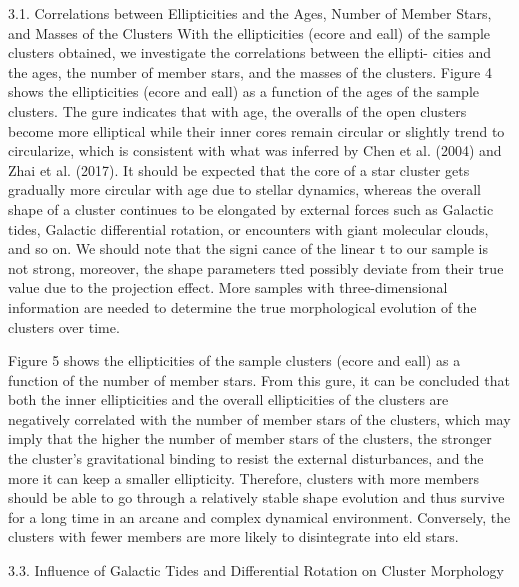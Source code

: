 \documentclass[../Main.tex]{subfiles}
\begin{document}
{3.1. Correlations between Ellipticities and the Ages, Number of
Member Stars, and Masses of the Clusters
With the ellipticities (ecore and eall) of the sample clusters
obtained, we investigate the correlations between the ellipti-
cities and the ages, the number of member stars, and the masses
of the clusters. Figure 4 shows the ellipticities (ecore and eall) as
a function of the ages of the sample clusters. The gure
indicates that with age, the overalls of the open clusters become
more elliptical while their inner cores remain circular or
slightly trend to circularize, which is consistent with what was
inferred by Chen et al. (2004) and Zhai et al. (2017). It should
be expected that the core of a star cluster gets gradually more
circular with age due to stellar dynamics, whereas the overall
shape of a cluster continues to be elongated by external forces
such as Galactic tides, Galactic differential rotation, or
encounters with giant molecular clouds, and so on. We should
note that the signi cance of the linear t to our sample is not
strong, moreover, the shape parameters tted possibly deviate
from their true value due to the projection effect. More samples
with three-dimensional information are needed to determine the
true morphological evolution of the clusters over time.

Figure 5 shows the ellipticities of the sample clusters (ecore
and eall) as a function of the number of member stars. From this
gure, it can be concluded that both the inner ellipticities and
the overall ellipticities of the clusters are negatively correlated
with the number of member stars of the clusters, which may
imply that the higher the number of member stars of the
clusters, the stronger the cluster’s gravitational binding to resist
the external disturbances, and the more it can keep a smaller
ellipticity. Therefore, clusters with more members should be
able to go through a relatively stable shape evolution and thus
survive for a long time in an arcane and complex dynamical
environment. Conversely, the clusters with fewer members are
more likely to disintegrate into eld stars.

3.3. Influence of Galactic Tides and Differential Rotation on
Cluster Morphology

}
\end{document}

